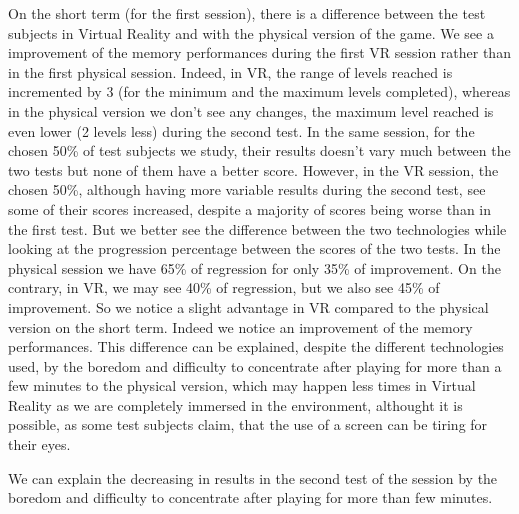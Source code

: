 \documentclass[12pt, openany, twocolumn]{article}
\begin{document}
    On the short term (for the first session), there is a difference between the test subjects in Virtual Reality and with the physical version of the game.
    We see a improvement of the memory performances during the first VR session rather than in the first physical session. Indeed, in VR, the range of levels reached 
    is incremented by 3 (for the minimum and the maximum levels completed), whereas in the physical version we don't see any changes, the maximum level reached is even lower (2 levels less) during the second test. 
    In the same session, for the chosen 50\% of test subjects we study, their results doesn't vary much between the two tests but none of them have a better score. 
    However, in the VR session, the chosen 50\%, although having more variable results during the second test, see some of their scores increased, despite a majority of scores being worse than in the first test.
    But we better see the difference between the two technologies while looking at the progression percentage between the scores of the two tests. In the physical session we have 65\% of regression for only 35\% of improvement. 
    On the contrary, in VR, we may see 40\% of regression, but we also see 45\% of improvement. 
    So we notice a slight advantage in VR compared to the physical version on the short term. Indeed we notice an improvement of the memory performances.
    This difference can be explained, despite the different technologies used, by the boredom and difficulty to concentrate after playing for more than a few minutes to the physical version, which may
    happen less times in Virtual Reality as we are completely immersed in the environment, althought it is possible, as some test subjects claim, that the use of a screen can be tiring for their eyes. 

    We can explain the decreasing in results in the second test of the session by the boredom and difficulty to concentrate after playing for more than few minutes. 
    

\end{document}
